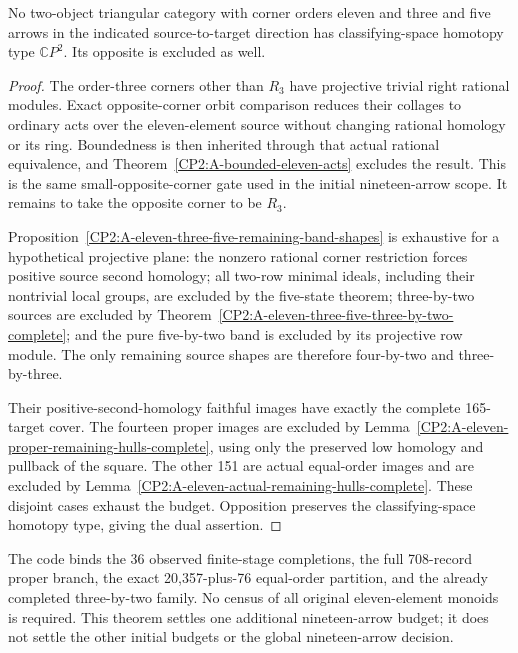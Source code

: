\begin{theorem}
\label{CP2:A-oriented-nineteen-eleven-three-five}
No two-object triangular category with corner orders eleven
and three and five arrows in the indicated source-to-target
direction has classifying-space homotopy type $\mathbb CP^2$.
Its opposite is excluded as well.
\end{theorem}
\begin{proof}
The order-three corners other than $R_3$ have projective
trivial right rational modules.  Exact opposite-corner orbit
comparison reduces their collages to ordinary acts over the
eleven-element source without changing rational homology or
its ring.  Boundedness is then inherited through that actual
rational equivalence, and
Theorem~\ref{CP2:A-bounded-eleven-acts} excludes the result.
This is the same small-opposite-corner gate used in the initial
nineteen-arrow scope.  It remains to take the opposite corner
to be $R_3$.

Proposition~\ref{CP2:A-eleven-three-five-remaining-band-shapes}
is exhaustive for a hypothetical projective plane: the
nonzero rational corner restriction forces positive source
second homology; all two-row minimal ideals, including their
nontrivial local groups, are excluded by the five-state
theorem; three-by-two sources are excluded by
Theorem~\ref{CP2:A-eleven-three-five-three-by-two-complete};
and the pure five-by-two band is excluded by its projective
row module.  The only remaining source shapes are therefore
four-by-two and three-by-three.

Their positive-second-homology faithful images have exactly
the complete 165-target cover.  The fourteen proper images
are excluded by
Lemma~\ref{CP2:A-eleven-proper-remaining-hulls-complete}, using
only the preserved low homology and pullback of the square.
The other 151 are actual equal-order images and are excluded
by Lemma~\ref{CP2:A-eleven-actual-remaining-hulls-complete}.
These disjoint cases exhaust the budget.  Opposition preserves
the classifying-space homotopy type, giving the dual assertion.
\end{proof}

\begin{remark*}
The code 
binds the 36 observed finite-stage completions, the full
708-record proper branch, the exact 20,357-plus-76 equal-order
partition, and the already completed three-by-two family.
No census of all original eleven-element monoids is required.
This theorem settles one additional nineteen-arrow budget;
it does not settle the other initial budgets or the global
nineteen-arrow decision.
\end{remark*}

